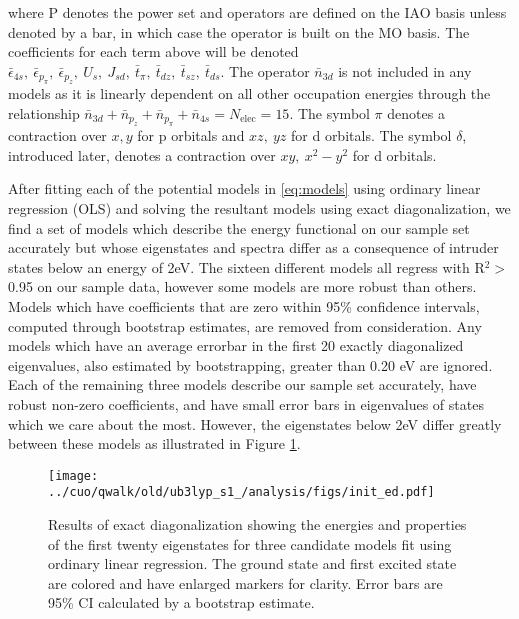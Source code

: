 \documentclass{article}
\begin{document}
where P denotes the power set and operators are defined on the IAO basis unless denoted by a bar, in which case the operator is built on the MO basis. The coefficients for each term above will be denoted $\bar{\epsilon}_{4s},\ \bar{\epsilon}_{p_\pi},\ \bar{\epsilon}_{p_z},\ U_s,\ J_{sd},\ \bar{t}_\pi,\ \bar{t}_{dz},\ \bar{t}_{sz},\ \bar{t}_{ds}$. The operator $\bar{n}_{3d}$ is not included in any models as it is linearly dependent on all other occupation energies through the relationship $\bar{n}_{3d} + \bar{n}_{p_z} + \bar{n}_{p_\pi} + \bar{n}_{4s} = N_\text{elec} = \text{15}$. The symbol $\pi$ denotes a contraction over $x, y$ for p orbitals and $xz,\ yz$ for d orbitals. The symbol $\delta$, introduced later, denotes a contraction over $xy,\ x^2-y^2$ for d orbitals.

After fitting each of the potential models in \eqref{eq:models} using ordinary linear regression (OLS) and solving the resultant models using exact diagonalization, we find a set of models which describe the energy functional on our sample set accurately but whose eigenstates and spectra differ as a consequence of intruder states below an energy of 2eV. 
The sixteen different models all regress with R$^2 >$ 0.95 on our sample data, however some models are more robust than others. 
Models which have coefficients that are zero within 95\% confidence intervals, computed through bootstrap estimates, are removed from consideration.
Any models which have an average errorbar in the first 20 exactly diagonalized eigenvalues, also estimated by bootstrapping, greater than 0.20 eV are ignored.
Each of the remaining three models describe our sample set accurately, have robust non-zero coefficients, and have small error bars in eigenvalues of states which we care about the most.
However, the eigenstates below 2eV differ greatly between these models as illustrated in Figure \ref{fig:InitED}.

\begin{figure}[H]
\begin{center}
\texttt{[image: ../cuo/qwalk/old/ub3lyp\_s1\_/analysis/figs/init\_ed.pdf]}
\end{center}
\caption{Results of exact diagonalization showing the energies and properties of the first twenty eigenstates for three candidate models fit using ordinary linear regression. The ground state and first excited state are colored and have enlarged markers for clarity. Error bars are 95\% CI calculated by a bootstrap estimate.}
\label{fig:InitED}
\end{figure}
\end{document}
